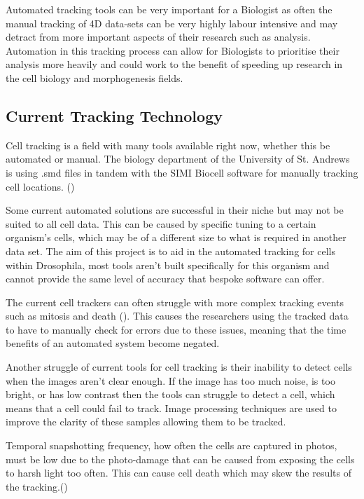\documentclass[12pt a4paper]{article}
\begin{document}
Automated tracking tools can be very important for a Biologist as often the manual tracking of 4D data-sets can be very highly labour intensive and may detract from more important aspects of their research such as analysis. Automation in this tracking process can allow for Biologists to prioritise their analysis more heavily and could work to the benefit of speeding up research in the cell biology and morphogenesis fields.
    \subsection{Current Tracking Technology}
    Cell tracking is a field with many tools available right now, whether this be automated or manual. The biology department of the University of St. Andrews is using .smd files in tandem with the SIMI Biocell software for manually tracking cell locations. (\cite{bischoff_cseresnyes_2009})
    
    Some current automated solutions are successful in their niche but may not be suited to all cell data. This can be caused by specific tuning to a certain organism's cells, which may be of a different size to what is required in another data set.  The aim of this project is to aid in the automated tracking for cells within Drosophila, most tools aren't built specifically for this organism and cannot provide the same level of accuracy that bespoke software can offer.
    
    The current cell trackers can often struggle with more complex tracking events such as mitosis and death (\cite{huh-et-al}). This causes the researchers using the tracked data to have to manually check for errors due to these issues, meaning that the time benefits of an automated system become negated.
    
    Another struggle of current tools for cell tracking is their inability to detect cells when the images aren't clear enough. If the image has too much noise, is too bright, or has low contrast then the tools can struggle to detect a cell, which means that a cell could fail to track. Image processing techniques are used to improve the clarity of these samples allowing them to be tracked. 
    
    Temporal snapshotting frequency, how often the cells are captured in photos, must be low due to the photo-damage that can be caused from exposing the cells to harsh light too often. This can cause cell death which may skew the results of the tracking.(\cite{Awasthi})
\end{document}
